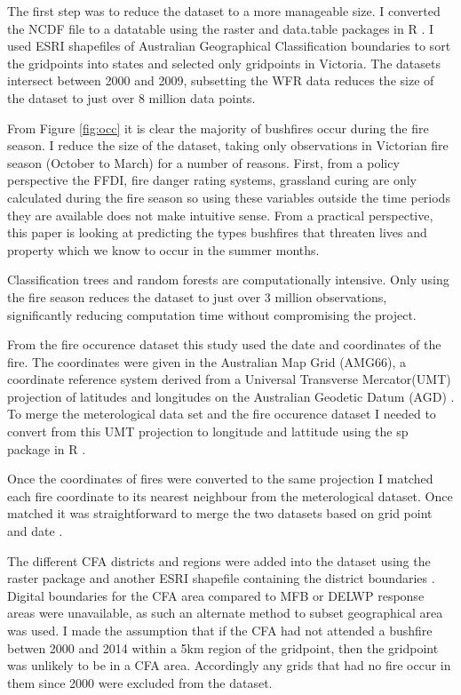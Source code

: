 \documentclass[11pt,a4paper]{article}
\begin{document}
The first step was to reduce the dataset to a more manageable size. I converted the NCDF file to a datatable using the raster and data.table packages in R \citep{raster, datatable}. I used ESRI shapefiles of Australian Geographical Classification boundaries \citep{ABS1259} to sort the gridpoints into states and selected only gridpoints in Victoria. The datasets intersect between 2000 and 2009, subsetting the WFR data reduces the size of the dataset to just over 8 million data points. 

From Figure \ref{fig:occ} it is clear the majority of bushfires occur during the fire season. I reduce the size of the dataset, taking only observations in Victorian fire season (October to March) for a number of reasons. First, from a policy perspective the FFDI, fire danger rating systems, grassland curing are only calculated during the fire season so using these variables outside the time periods they are available does not make intuitive sense. From a practical perspective, this paper is looking at predicting the types bushfires that threaten lives and property which we know to occur in the summer months. 

Classification trees and random forests are computationally intensive. Only using the fire season reduces the dataset to just over 3 million observations, significantly reducing computation time without compromising the project. 

From the fire occurence dataset this study used the date and coordinates of the fire. The coordinates were given in the Australian Map Grid (AMG66), a coordinate reference system derived from a Universal Transverse Mercator(UMT) projection of latitudes and longitudes on the Australian Geodetic Datum (AGD) \citep{featherstone96}. To merge the meterological data set and the fire occurence dataset I needed to convert from this UMT projection to longitude and lattitude using the sp package in R \citep{sp08}. 

Once the coordinates of fires were converted to the same projection I matched each fire coordinate to its nearest neighbour from the meterological dataset. Once matched it was straightforward to merge the two datasets based on grid point and date \citep{datatable}. 

The different CFA districts and regions were added into the dataset using the raster package and another ESRI shapefile containing the district boundaries \citep{raster}. 
Digital boundaries for the CFA area compared to MFB or DELWP response areas were unavailable, as such an alternate method to subset geographical area was used. I made the assumption that if the CFA had not attended a bushfire betwen 2000 and 2014 within a 5km region of the gridpoint, then the gridpoint was unlikely to be in a CFA area. Accordingly any grids that had no fire occur in them since 2000 were excluded from the dataset. 
\end{document}
